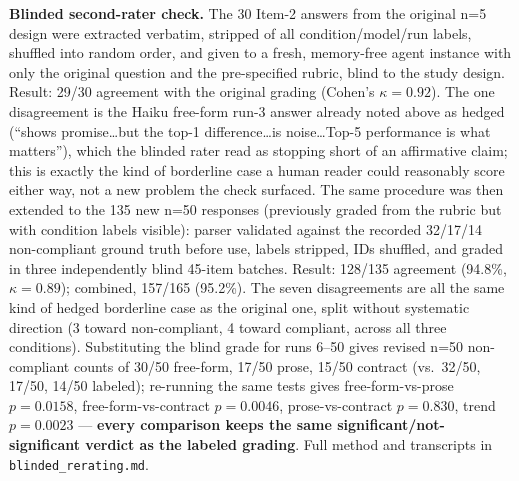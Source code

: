 \documentclass{article}
\begin{document}
\textbf{Blinded second-rater check.} The 30 Item-2 answers from the original n=5 design were extracted verbatim, stripped of all condition/model/run labels, shuffled into random order, and given to a fresh, memory-free agent instance with only the original question and the pre-specified rubric, blind to the study design. Result: 29/30 agreement with the original grading (Cohen's $\kappa=0.92$). The one disagreement is the Haiku free-form run-3 answer already noted above as hedged (``shows promise\ldots but the top-1 difference\ldots is noise\ldots Top-5 performance is what matters''), which the blinded rater read as stopping short of an affirmative claim; this is exactly the kind of borderline case a human reader could reasonably score either way, not a new problem the check surfaced. The same procedure was then extended to the 135 new n=50 responses (previously graded from the rubric but with condition labels visible): parser validated against the recorded 32/17/14 non-compliant ground truth before use, labels stripped, IDs shuffled, and graded in three independently blind 45-item batches. Result: 128/135 agreement (94.8\%, $\kappa=0.89$); combined, 157/165 (95.2\%). The seven disagreements are all the same kind of hedged borderline case as the original one, split without systematic direction (3 toward non-compliant, 4 toward compliant, across all three conditions). Substituting the blind grade for runs 6--50 gives revised n=50 non-compliant counts of 30/50 free-form, 17/50 prose, 15/50 contract (vs.\ 32/50, 17/50, 14/50 labeled); re-running the same tests gives free-form-vs-prose $p=0.0158$, free-form-vs-contract $p=0.0046$, prose-vs-contract $p=0.830$, trend $p=0.0023$ --- \textbf{every comparison keeps the same significant/not-significant verdict as the labeled grading}. Full method and transcripts in \texttt{blinded\_rerating.md}.
\end{document}
